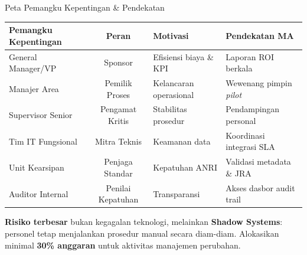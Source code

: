 \documentclass[aspectratio=169,11pt]{beamer}
\begin{document}
\begin{frame}{Peta Pemangku Kepentingan \& Pendekatan}
    \vspace{0.2cm}
    \begin{table}
        \centering
        \tiny
        \begin{tabularx}{\textwidth}{@{} >{\raggedright\arraybackslash}X c >{\raggedright\arraybackslash}X >{\raggedright\arraybackslash}X @{}}
            \toprule
            \textbf{Pemangku Kepentingan} & \textbf{Peran} & \textbf{Motivasi} & \textbf{Pendekatan MA} \\
            \midrule
            General Manager/VP & Sponsor & Efisiensi biaya \& KPI & Laporan ROI berkala \\
            Manajer Area & Pemilik Proses & Kelancaran operasional & Wewenang pimpin \textit{pilot} \\
            Supervisor Senior & Pengamat Kritis & Stabilitas prosedur & Pendampingan personal \\
            Tim IT Fungsional & Mitra Teknis & Keamanan data & Koordinasi integrasi SLA \\
            Unit Kearsipan & Penjaga Standar & Kepatuhan ANRI & Validasi metadata \& JRA \\
            Auditor Internal & Penilai Kepatuhan & Transparansi & Akses dasbor audit trail \\
            \bottomrule
        \end{tabularx}
    \end{table}
    \vspace{0.2cm}
    \begin{greenbox}
        \scriptsize \textbf{Risiko terbesar} bukan kegagalan teknologi, melainkan \textbf{Shadow Systems}: personel tetap menjalankan prosedur manual secara diam-diam. Alokasikan minimal \textbf{30\% anggaran} untuk aktivitas manajemen perubahan.
    \end{greenbox}
\end{frame}
\end{document}
